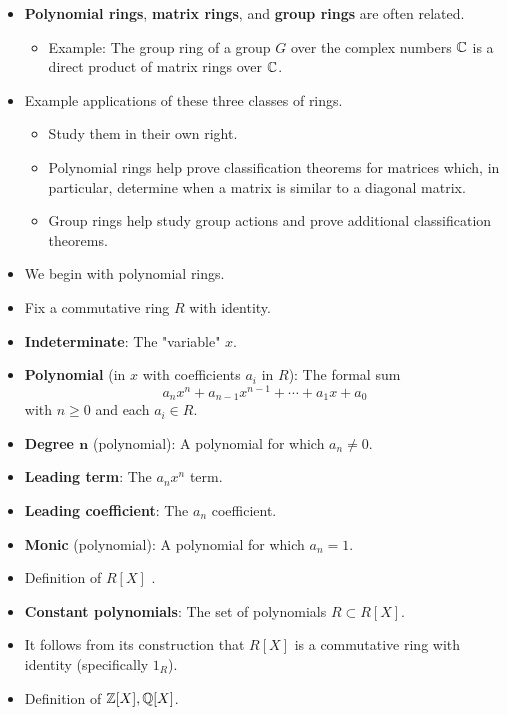 \documentclass[../notes.tex]{subfiles}
\begin{document}
\begin{itemize}
    \item \textbf{Polynomial rings}, \textbf{matrix rings}, and \textbf{group rings} are often related.
    \begin{itemize}
        \item Example: The group ring of a group $G$ over the complex numbers $\mathbb{C}$ is a direct product of matrix rings over $\mathbb{C}$.
    \end{itemize}
    \item Example applications of these three classes of rings.
    \begin{itemize}
        \item Study them in their own right.
        \item Polynomial rings help prove classification theorems for matrices which, in particular, determine when a matrix is similar to a diagonal matrix.
        \item Group rings help study group actions and prove additional classification theorems.
    \end{itemize}
    \item We begin with polynomial rings.
    \item Fix a commutative ring $R$ with identity.
    \item \textbf{Indeterminate}: The "variable" $x$.
    \item \textbf{Polynomial} (in $x$ with coefficients $a_i$ in $R$): The formal sum
    \begin{equation*}
        a_nx^n+a_{n-1}x^{n-1}+\cdots+a_1x+a_0
    \end{equation*}
    with $n\geq 0$ and each $a_i\in R$.
    \item \textbf{Degree $\bm{n}$} (polynomial): A polynomial for which $a_n\neq 0$.
    \item \textbf{Leading term}: The $a_nx^n$ term.
    \item \textbf{Leading coefficient}: The $a_n$ coefficient.
    \item \textbf{Monic} (polynomial): A polynomial for which $a_n=1$.
    \item Definition of $R[X]$ \parencite[234]{bib:DummitFoote}.
    \item \textbf{Constant polynomials}: The set of polynomials $R\subset R[X]$.
    \item It follows from its construction that $R[X]$ is a commutative ring with identity (specifically $1_R$).
    \item Definition of $\mathbb{Z}[X],\mathbb{Q}[X]$.

\end{itemize}
\end{document}
